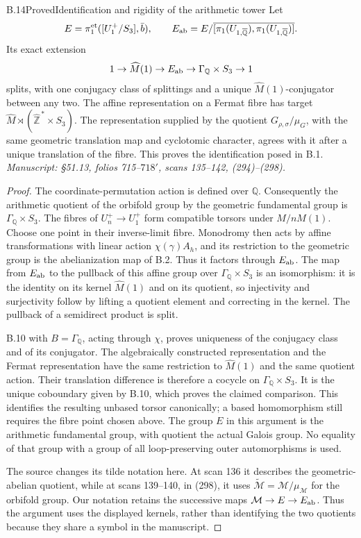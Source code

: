 \begin{statement}{B.14}{Proved}{Identification and rigidity of the arithmetic tower}
Let
\[
 E=\pi_1^{\mathrm{et}}([U_1^+/S_3],\bar b),\qquad
 E_{\rm ab}=E/\overline{[\pi_1(U_{1,\overline{\mathbb Q}}),
                              \pi_1(U_{1,\overline{\mathbb Q}})]}.
\]
Its exact extension
\[
 1\to\widehat M(1)\to E_{\rm ab}\to\Gamma_{\mathbb Q}\times S_3\to1
\]
splits, with one conjugacy class of splittings and a unique
\(\widehat M(1)\)-conjugator between any two. The affine representation
on a Fermat fibre has target
\(\widehat M\rtimes(\widehat{\mathbb Z}^{\,*}\times S_3)\).
The representation supplied by the quotient
\(G_{\rho,\sigma}/\mu_G\), with the same geometric translation map
and cyclotomic character, agrees with it after a unique translation
of the fibre. This proves the identification posed in B.1.
\emph{Manuscript: \S51.13, folios 715--\(718'\), scans 135--142,
(294)--(298).}
\end{statement}
\begin{proof}
The coordinate-permutation action is defined over \(\mathbb Q\).
Consequently the arithmetic quotient of the orbifold group by the
geometric fundamental group is
\(\Gamma_{\mathbb Q}\times S_3\).
The fibres of \(U_n^+\to U_1^+\) form compatible torsors under
\(M/nM(1)\). Choose one point in their inverse-limit fibre.
Monodromy then acts by affine transformations with linear action
\(\chi(\gamma)A_h\), and its restriction to the geometric group is
the abelianization map of B.2. Thus it factors through \(E_{\rm ab}\).
The map from \(E_{\rm ab}\) to the pullback of this affine group over
\(\Gamma_{\mathbb Q}\times S_3\) is an isomorphism: it is the identity
on its kernel \(\widehat M(1)\) and on its quotient, so injectivity
and surjectivity follow by lifting a quotient element and correcting
in the kernel. The pullback of a semidirect product is split.

B.10 with \(B=\Gamma_{\mathbb Q}\), acting through \(\chi\), proves
uniqueness of the conjugacy class and of its conjugator.
The algebraically constructed representation and the Fermat
representation have the same restriction to \(\widehat M(1)\)
and the same quotient action. Their translation difference is
therefore a cocycle on \(\Gamma_{\mathbb Q}\times S_3\).
It is the unique coboundary given by B.10, which proves the
claimed comparison. This identifies the resulting unbased torsor
canonically; a based homomorphism still requires the fibre point
chosen above. The group \(E\) in this argument is the arithmetic
fundamental group, with quotient the actual Galois group.
No equality of that group with a group of all loop-preserving
outer automorphisms is used.

The source changes its tilde notation here. At scan 136 it describes
the geometric-abelian quotient, while at scans 139--140, in (298),
it uses \(\widetilde{\mathcal M}=\mathcal M/\mu_{\mathcal M}\)
for the orbifold group. Our notation retains the successive maps
\(\mathcal M\to E\to E_{\rm ab}\). Thus the argument uses the
displayed kernels, rather than identifying the two quotients
because they share a symbol in the manuscript.
\end{proof}

